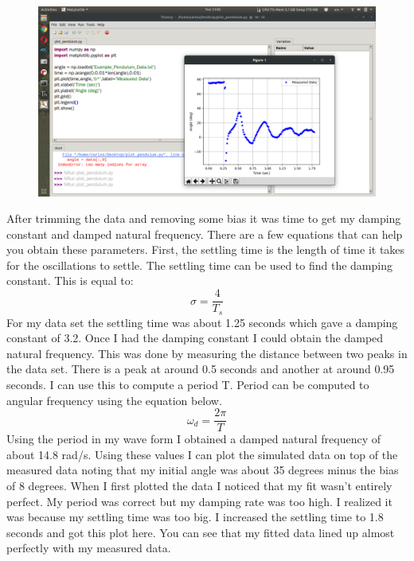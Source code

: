 \begin{figure}[H]
  \begin{center}
    \includegraphics[width=\textwidth]{Figures/oscillation_plots.png}
  \end{center}
\end{figure}
After trimming the data and removing some bias it was time to get my damping constant and damped natural frequency. There are a few equations that can help you obtain these parameters. First, the settling time is the length of time it takes for the oscillations to settle. The settling time can be used to find the damping constant. This is equal to:
\begin{equation}
\sigma = \frac{4}{T_s}
\end{equation}
For my data set the settling time was about 1.25 seconds which gave a damping constant of 3.2. Once I had the damping constant I could obtain the damped natural frequency. This was done by measuring the distance between two peaks in the data set. There is a peak at around 0.5 seconds and another at around 0.95 seconds. I can use this to compute a period T. Period can be computed to angular frequency using the equation below.
\begin{equation}
\omega_d = \frac{2\pi}{T}
\end{equation}
Using the period in my wave form I obtained a damped natural frequency of about 14.8 rad/s. Using these values I can plot the simulated data on top of the measured data noting that my initial angle was about 35 degrees minus the bias of 8 degrees. When I first plotted the data I noticed that my fit wasn’t entirely perfect. My period was correct but my damping rate was too high. I realized it was because my settling time was too big. I increased the settling time to 1.8 seconds and got this plot here. You can see that my fitted data lined up almost perfectly with my measured data.
